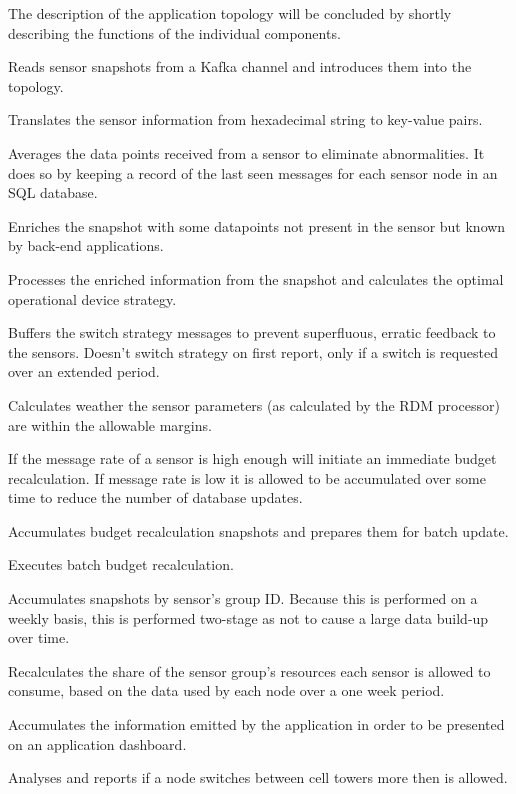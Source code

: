 The description of the application topology will be concluded by shortly describing the functions of the individual components.
\begin{description}[style=nextline]
\nospace
\item[Sensit spout] Reads sensor snapshots from a Kafka channel and introduces them into the topology.
\item[Translator] Translates the sensor information from hexadecimal string to key-value pairs.
\item[Nuancer] Averages the data points received from a sensor to eliminate abnormalities. It does so by keeping a record of the last seen messages for each sensor node in an SQL database.
\item[Attributor] Enriches the snapshot with some datapoints not present in the sensor but known by  back-end applications.
\item[Sensor RDM processor] Processes the enriched information from the snapshot and calculates the optimal operational device strategy.
\item[Switch strategy buffer] Buffers the switch strategy messages to prevent superfluous, erratic feedback to the sensors. Doesn't switch strategy on first report, only if a switch is requested over an extended period.
\item[Single message analyser] Calculates weather the sensor parameters (as calculated by the RDM processor) are within the allowable margins.
\item[Budget recalculator interface]If the message rate of a sensor is high enough will initiate an immediate budget recalculation. If message rate is low it is allowed to be accumulated over some time to reduce the number of database updates.
\item[Budget recalculator accumulator] Accumulates budget recalculation snapshots and prepares them  for batch update.
\item[Budget recalculator] Executes batch budget recalculation.
\item[Group accumulator] Accumulates snapshots by sensor's group ID. Because this is performed on a weekly basis, this is performed two-stage as not to cause a large data build-up over time.
\item[Group share recalculator] Recalculates the share of the sensor group's resources each sensor is allowed to consume, based on the data used by each node over a one week period.
\item[Application accumulator] Accumulates the information emitted by the application in order to be presented on an application dashboard.
\item[Cell Switch Analyser] Analyses and reports if a node switches between cell towers more then is allowed.
\end{description}

